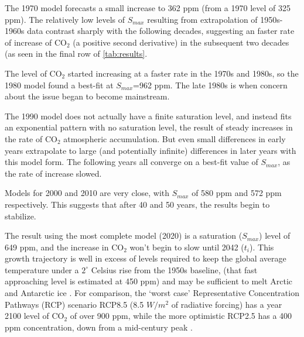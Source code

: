 \documentclass{article}
\begin{document}
The 1970 model forecasts a small increase to 362 ppm (from a 1970 level of 325 ppm). The relatively low levels of $S_{max}$  resulting from extrapolation of 1950s-1960s data contrast sharply with the following decades, suggesting an faster rate of increase of $\mathrm{CO_{2}}$ (a positive second derivative) in the subsequent two decades (as seen in the final row of \autoref{tab:results}. 

The level of $\mathrm{CO_{2}}$ started increasing at a faster rate in the 1970s and 1980s, so the 1980 model found a best-fit at $S_{max}$=962 ppm. The late 1980s is when concern about the issue began to become mainstream.

The 1990 model does not actually have a finite saturation level, and instead fits an exponential pattern with no saturation level, the result of steady  increases in the rate of $\mathrm{CO_{2}}$ atmospheric accumulation. But even small differences in early years extrapolate to large (and potentially infinite) differences in later years with this model form. The following years all converge on a best-fit value of $S_{max}$, as the rate of increase slowed.

Models for 2000 and 2010 are very close, with $S_{max}$ of 580 ppm and 572 ppm respectively. This suggests that after 40 and 50 years, the results begin to stabilize. 

The result using the most complete model (2020) is a saturation ($S_{max}$) level of 649 ppm, and the increase in $\mathrm{CO_{2}}$ won't begin to slow until 2042 ($t_i$). This growth trajectory is well in excess of levels required to keep the global average  temperature under a $2^{\circ}$  Celsius rise from the 1950s baseline, (that fast approaching level is estimated at 450 ppm) and may be sufficient to melt Arctic and Antarctic ice \citep{fischetti2011prescription}. For comparison, the `worst case' Representative Concentration Pathways (RCP) scenario RCP8.5 (8.5 $W/m^{2}$ of radiative forcing) has a year 2100 level of $\mathrm{CO_{2}}$ of over 900 ppm, while the more optimistic RCP2.5 has a 400 ppm concentration, down from a mid-century peak \citep{vanvuuren2011representative}.
\end{document}
